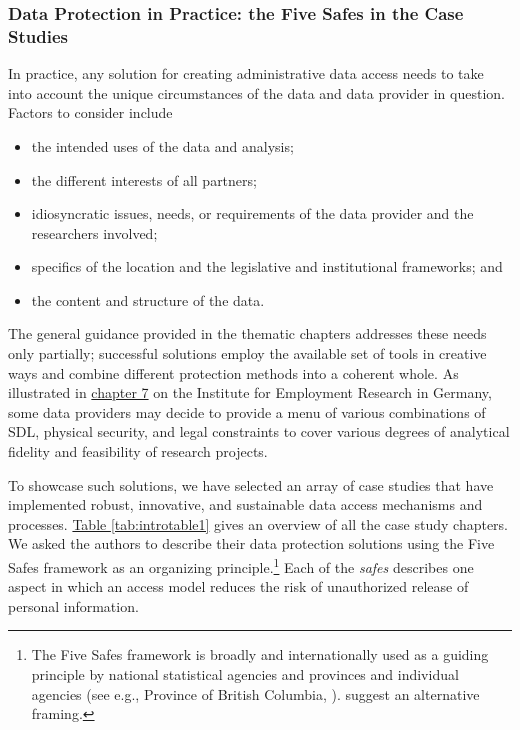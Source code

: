 \documentclass[
]{WileySix}
\providecommand{\tightlist}{%
  \setlength{\itemsep}{0pt}\setlength{\parskip}{0pt}}
\begin{document}
\hypertarget{data-protection-in-practice-the-five-safes-in-the-case-studies}{%
\subsubsection{Data Protection in Practice: the Five Safes in the Case Studies}\label{data-protection-in-practice-the-five-safes-in-the-case-studies}}

In practice, any solution for creating administrative data access needs to take into account the unique circumstances of the data and data provider in question. Factors to consider include

\begin{itemize}
\tightlist
\item
  the intended uses of the data and analysis;
\item
  the different interests of all partners;
\item
  idiosyncratic issues, needs, or requirements of the data provider and the researchers involved;
\item
  specifics of the location and the legislative and institutional frameworks; and
\item
  the content and structure of the data.
\end{itemize}

The general guidance provided in the thematic chapters addresses these needs only partially; successful solutions employ the available set of tools in creative ways and combine different protection methods into a coherent whole. As illustrated in \protect\hyperlink{iab}{chapter 7} on the Institute for Employment Research in Germany, some data providers may decide to provide a menu of various combinations of SDL, physical security, and legal constraints to cover various degrees of analytical fidelity and feasibility of research projects.

To showcase such solutions, we have selected an array of case studies that have implemented robust, innovative, and sustainable data access mechanisms and processes. \href{https://drive.google.com/file/d/11QOJs0fXgLJp9W74SpWCti2_glpmonHC/view?usp=sharing}{Table \ref{tab:introtable1}} gives an overview of all the case study chapters. We asked the authors to describe their data protection solutions using the Five Safes framework \citep{desai2016} as an organizing principle.\footnote{The Five Safes framework is broadly and internationally used as a guiding principle by national statistical agencies \citep{australianbureauofstatistics2017, statisticscanada2018} and provinces and individual agencies (see e.g., Province of British Columbia, \citet{bcministryofcitizensservices}). \citet{altman2015} suggest an alternative framing.} Each of the \emph{safes} describes one aspect in which an access model reduces the risk of unauthorized release of personal information.
\end{document}
